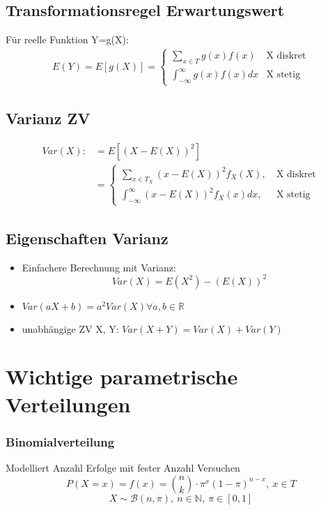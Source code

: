 \documentclass[10pt,a4paper,landscape]{article}
\begin{document}
\begin{multicols}{4}
\subsection{Transformationsregel Erwartungswert}
Für reelle Funktion Y=g(X):
\begin{align*}
E(Y)=E[g(X)]=\begin{cases}
\sum_{x\in T}g(x)f(x) &\text{X diskret} \\
\int_{-\infty}^{\infty}g(x)f(x)dx &\text{X stetig}
\end{cases}
\end{align*}

\subsection{Varianz ZV}
\begin{align*}
Var(X) :&= E[(X-E(X))^2] \\
&= \begin{cases}
\sum_{x \in T_X}(x-E(X))^2f_X(X), &~\text{X diskret} \\
\int_{-\infty}^{\infty}(x-E(X))^2f_X(x)dx, &~\text{X stetig}
\end{cases}
\end{align*}

\subsection*{Eigenschaften Varianz}
\begin{itemize}
\item Einfachere Berechnung mit Varianz:
\[
Var(X)=E(X^2)-(E(X))^2
\]
\item $Var(aX+b)=a^2Var(X) \forall a,b \in \mathbb{R}$
\item unabhängige ZV X, Y: $Var(X+Y)=Var(X)+Var(Y)$
\end{itemize}


\section{Wichtige parametrische Verteilungen}

\subsubsection{Binomialverteilung}
Modelliert Anzahl Erfolge mit fester Anzahl Versuchen
\[
P(X=x)=f(x)=\binom{n}{k} \cdot \pi^x(1-\pi)^{n-x}, ~ x \in T 
\]
\[
X \sim \mathcal{B}(n, \pi), ~ n \in \mathbb{N}, ~\pi \in [0,1]
\]


\end{multicols}
\end{document}
